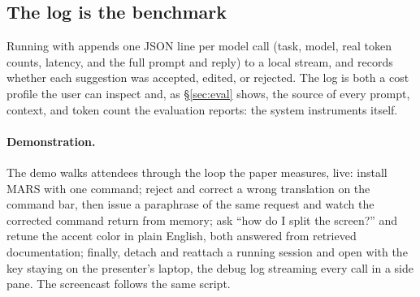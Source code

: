 \subsection{The log is the benchmark}
\label{sec:log}

Running with  appends one JSON line per model call (task, model, real
token counts, latency, and the full prompt and reply) to a local stream, and records
whether each suggestion was accepted, edited, or rejected. The log is both a cost
profile the user can inspect and, as \S\ref{sec:eval} shows, the source of every prompt,
context, and token count the evaluation reports: the system instruments itself.

\paragraph{Demonstration.}
The demo walks attendees through the loop the paper measures, live: install MARS with
one  command; reject and correct a wrong translation on the command bar,
then issue a paraphrase of the same request and watch the corrected command return
from memory; ask ``how do I split the screen?'' and retune
the accent color in plain English, both answered from retrieved documentation; finally, detach and reattach a running session and open
 with the key staying on the presenter's laptop, the debug log
streaming every call in a side pane. The screencast follows the same script.

%
%
